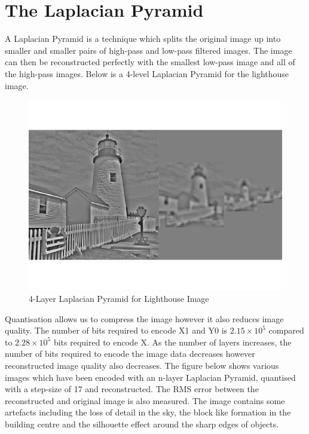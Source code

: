 \documentclass{article}					%
\begin{document}
\section{The Laplacian Pyramid}
A Laplacian Pyramid is a technique which splits the original image up into smaller and smaller pairs of high-pass and low-pass filtered images. The image can then be reconstructed perfectly with the smallest low-pass image and all of the high-pass images. Below is a 4-level Laplacian Pyramid for the lighthouse image.
\begin{figure}[ht!]
\begin{centering}
\includegraphics{15}
\caption{4-Layer Laplacian Pyramid for Lighthouse Image}
\end{centering}
\end{figure}
Quantisation allows us to compress the image however it also reduces image quality. The number of bits required to encode X1 and Y0 is $2.15\times 10^5$ compared to $2.28\times 10^5$ bits required to encode X. As the number of layers increases, the number of bits required to encode the image data decreases however reconstructed image quality also decreases. The figure below shows various images which have been encoded with an n-layer Laplacian Pyramid, quantised with a step-size of 17 and reconstructed. The RMS error between the reconstructed and original image is also measured. The image contains some artefacts including the loss of detail in the sky, the block like formation in the building centre and the silhouette effect around the sharp edges of objects.
\newpage
\end{document}
